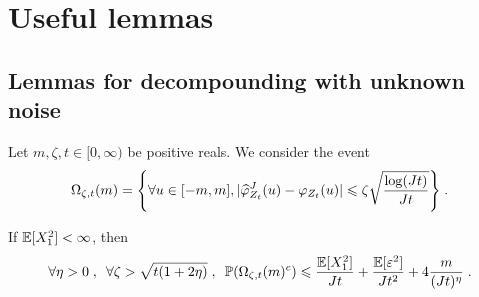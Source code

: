 \section{Useful lemmas}
\label{s:alem}

\subsection{Lemmas for decompounding with unknown noise}
\begin{lemma}\label{lm:main1}
Let $m, \zeta, t \in [0, \infty)$ be positive reals. We consider the event
    \begin{equation*}
        \Omega_{\zeta, t}(m) = \Bigg\{ 
            \forall u \in [-m, m], |\widehat \varphi^J_{Z_{t}}(u) - \varphi_{Z_{t}}(u)|
            \leqslant
            \zeta \sqrt{\frac{\log(J t)}{J t}}
        \Bigg\}
        \; .
    \end{equation*}
    
        If $\mathbb{E}[X_1^2] < \infty$, then
            \begin{equation*}
                \forall \eta > 0 
                \; , \enspace
                \forall \zeta > \sqrt{t(1 + 2 \eta)}
                \; , \enspace
                \mathbb{P}(\Omega_{\zeta, t}(m)^c) \leqslant \frac{\mathbb{E}[X_1^2]}{J t} + \frac{ \mathbb{E}[\varepsilon^2]}{J t^2} + 4 \frac{m}{(J t)^\eta}
                \; .
            \end{equation*}
\end{lemma}
